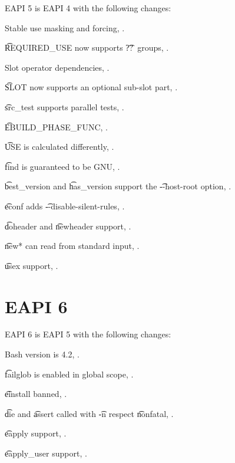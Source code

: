 EAPI 5 is EAPI 4 with the following changes:

\begin{compactitem}
\item Stable use masking and forcing, .
\item \t{REQUIRED\_USE} now supports \t{??}\ groups, .
\item Slot operator dependencies, .
\item \t{SLOT} now supports an optional sub-slot part, .
\item \t{src\_test} supports parallel tests, .
\item \t{EBUILD\_PHASE\_FUNC}, .
\item \t{USE} is calculated differently, .
\item \t{find} is guaranteed to be GNU, .
\item \t{best\_version} and \t{has\_version} support the \t{-{}-host-root} option,
    .
\item \t{econf} adds \t{-{}-disable-silent-rules}, .
\item \t{doheader} and \t{newheader} support, .
\item \t{new*} can read from standard input, .
\item \t{usex} support, .
\end{compactitem}

\section*{EAPI 6}

EAPI 6 is EAPI 5 with the following changes:

\begin{compactitem}
\item Bash version is 4.2, .
\item \t{failglob} is enabled in global scope, .
\item \t{einstall} banned, .
\item \t{die} and \t{assert} called with \t{-n} respect \t{nonfatal}, .
\item \t{eapply} support, .
\item \t{eapply\_user} support, .
\end{compactitem}



